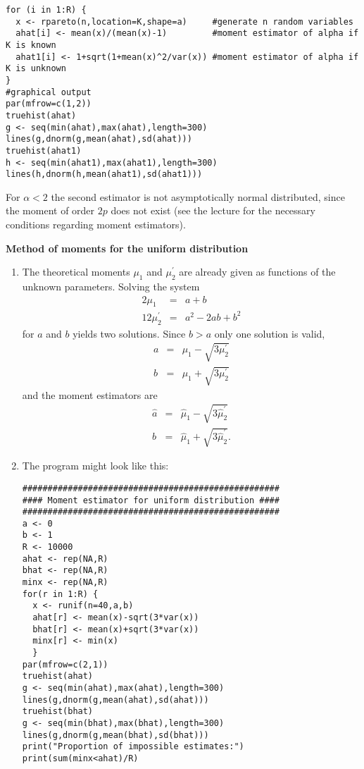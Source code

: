 \begin{Solution}{11.5}
\begin{enumerate}
\begin{verbatim}
for (i in 1:R) {
  x <- rpareto(n,location=K,shape=a)     #generate n random variables
  ahat[i] <- mean(x)/(mean(x)-1)         #moment estimator of alpha if K is known
  ahat1[i] <- 1+sqrt(1+mean(x)^2/var(x)) #moment estimator of alpha if K is unknown
}
#graphical output
par(mfrow=c(1,2))
truehist(ahat)
g <- seq(min(ahat),max(ahat),length=300)
lines(g,dnorm(g,mean(ahat),sd(ahat)))
truehist(ahat1)
h <- seq(min(ahat1),max(ahat1),length=300)
lines(h,dnorm(h,mean(ahat1),sd(ahat1)))
\end{verbatim}
For $\alpha <2$ the second estimator is not asymptotically normal
distributed, since the moment of order $2p$ does not exist (see the
lecture for the necessary conditions regarding moment estimators).
\end{enumerate}
\end{Solution}
\begin{Solution}{11.6}
\textbf{Method of moments for the uniform distribution}

\begin{enumerate}
\item The theoretical moments $\mu _{1}$ and $\mu _{2}^{\prime }$ are
already given as functions of the unknown parameters. Solving the system%
\begin{eqnarray*}
2\mu _{1} &=&a+b \\
12\mu _{2}^{\prime } &=&a^{2}-2ab+b^{2}
\end{eqnarray*}%
for $a$ and $b$ yields two solutions. Since $b>a$ only one solution is valid,%
\begin{eqnarray*}
a &=&\mu _{1}-\sqrt{3\mu _{2}^{\prime }} \\
b &=&\mu _{1}+\sqrt{3\mu _{2}^{\prime }}
\end{eqnarray*}%
and the moment estimators are%
\begin{eqnarray*}
\hat{a} &=&\hat{\mu}_{1}-\sqrt{3\hat{\mu}_{2}^{\prime }} \\
\hat{b} &=&\hat{\mu}_{1}+\sqrt{3\hat{\mu}_{2}^{\prime }}.
\end{eqnarray*}

\item The program might look like this:

\begin{verbatim}
###################################################
#### Moment estimator for uniform distribution ####
###################################################
a <- 0
b <- 1
R <- 10000
ahat <- rep(NA,R)
bhat <- rep(NA,R)
minx <- rep(NA,R)
for(r in 1:R) {
  x <- runif(n=40,a,b)
  ahat[r] <- mean(x)-sqrt(3*var(x))
  bhat[r] <- mean(x)+sqrt(3*var(x))
  minx[r] <- min(x)
  }
par(mfrow=c(2,1))
truehist(ahat)
g <- seq(min(ahat),max(ahat),length=300)
lines(g,dnorm(g,mean(ahat),sd(ahat)))
truehist(bhat)
g <- seq(min(bhat),max(bhat),length=300)
lines(g,dnorm(g,mean(bhat),sd(bhat)))
print("Proportion of impossible estimates:")
print(sum(minx<ahat)/R)
\end{verbatim}
\end{enumerate}
\end{Solution}
